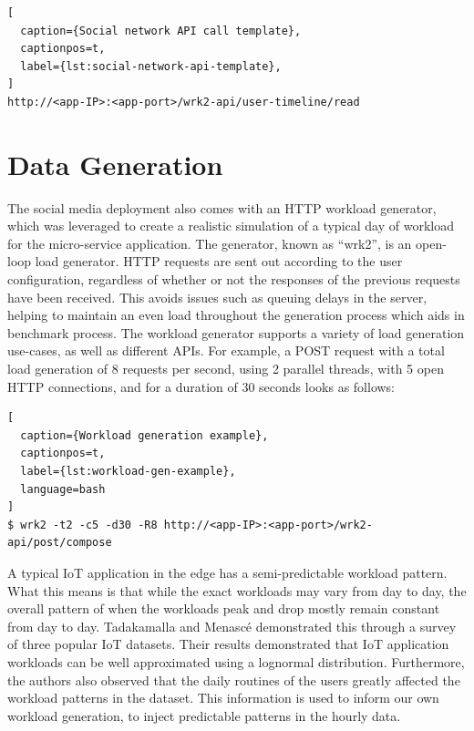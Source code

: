 \begin{lstlisting}[
  caption={Social network API call template},
  captionpos=t,
  label={lst:social-network-api-template},
]
http://<app-IP>:<app-port>/wrk2-api/user-timeline/read
\end{lstlisting}

\section{Data Generation}
\label{sec:ch4-data-generation}

The social media deployment also comes with an HTTP workload generator, which
was leveraged to create a realistic simulation of a typical day of workload for the micro-service application. The generator, known as ``wrk2'', is an open-loop load generator. HTTP requests are sent out according to the user configuration, regardless of whether or not the responses of the previous requests have been received. This avoids issues such as queuing delays in the server, helping to maintain an even load throughout the generation process which aids in benchmark process. The workload generator supports a variety of load generation use-cases, as well as different APIs. For example, a POST request with a total load generation of 8 requests per second, using 2 parallel threads, with 5 open HTTP connections, and for a duration of 30 seconds looks as follows:\par

\begin{lstlisting}[
  caption={Workload generation example},
  captionpos=t,
  label={lst:workload-gen-example},
  language=bash
]
$ wrk2 -t2 -c5 -d30 -R8 http://<app-IP>:<app-port>/wrk2-api/post/compose
\end{lstlisting}

A typical IoT application in the edge has a semi-predictable workload pattern. What this means is that while the exact workloads may vary from day to day, the overall pattern of when the workloads peak and drop mostly remain constant from day to day. Tadakamalla and Menasc{\'e} \cite{tadakamalla2019characterization} demonstrated this through a survey of three popular IoT datasets. Their results demonstrated that IoT application workloads can be well approximated using a lognormal distribution. Furthermore, the authors also observed that the daily routines of the users greatly affected the workload patterns in the dataset. This information is used to inform our own workload generation, to inject predictable patterns in the hourly data.\par

